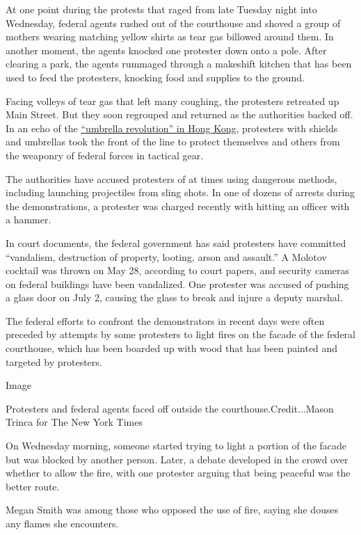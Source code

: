 At one point during the protests that raged from late Tuesday night into
Wednesday, federal agents rushed out of the courthouse and shoved a
group of mothers wearing matching yellow shirts as tear gas billowed
around them. In another moment, the agents knocked one protester down
onto a pole. After clearing a park, the agents rummaged through a
makeshift kitchen that has been used to feed the protesters, knocking
food and supplies to the ground.

Facing volleys of tear gas that left many coughing, the protesters
retreated up Main Street. But they soon regrouped and returned as the
authorities backed off. In an echo of the
\href{https://www.nytimes3xbfgragh.onion/interactive/2014/10/01/world/asia/hong-kong-protest-photos.html}{``umbrella
revolution'' in Hong Kong}, protesters with shields and umbrellas took
the front of the line to protect themselves and others from the weaponry
of federal forces in tactical gear.

The authorities have accused protesters of at times using dangerous
methods, including launching projectiles from sling shots. In one of
dozens of arrests during the demonstrations, a protester was charged
recently with hitting an officer with a hammer.

In court documents, the federal government has said protesters have
committed ``vandalism, destruction of property, looting, arson and
assault.'' A Molotov cocktail was thrown on May 28, according to court
papers, and security cameras on federal buildings have been vandalized.
One protester was accused of pushing a glass door on July 2, causing the
glass to break and injure a deputy marshal.

The federal efforts to confront the demonstrators in recent days were
often preceded by attempts by some protesters to light fires on the
facade of the federal courthouse, which has been boarded up with wood
that has been painted and targeted by protesters.

Image

Protesters and federal agents faced off outside the
courthouse.Credit...Mason Trinca for The New York Times

On Wednesday morning, someone started trying to light a portion of the
facade but was blocked by another person. Later, a debate developed in
the crowd over whether to allow the fire, with one protester arguing
that being peaceful was the better route.

Megan Smith was among those who opposed the use of fire, saying she
douses any flames she encounters.

